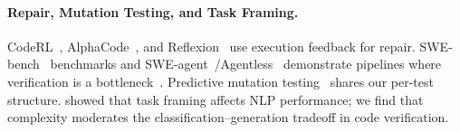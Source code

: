 \paragraph{Repair, Mutation Testing, and Task Framing.}
CodeRL~\cite{le2022coderl}, AlphaCode~\cite{li2022alphacode,alphacode2023team}, and Reflexion~\cite{shinn2023reflexion} use execution feedback for repair. SWE-bench~\cite{jimenez2024swebench,chowdhury2024swebenchverified} benchmarks and SWE-agent~\cite{yang2024sweagent}/Agentless~\cite{xia2024agentless} demonstrate pipelines where verification is a bottleneck~\cite{yang2025aprsurvey}. Predictive mutation testing~\cite{tufano2019predictive,kim2022predictive,wang2024llmmutation,jain2023contextual} shares our per-test structure. \citet{raffel2020t5} showed that task framing affects NLP performance; we find that complexity moderates the classification--generation tradeoff in code verification.

